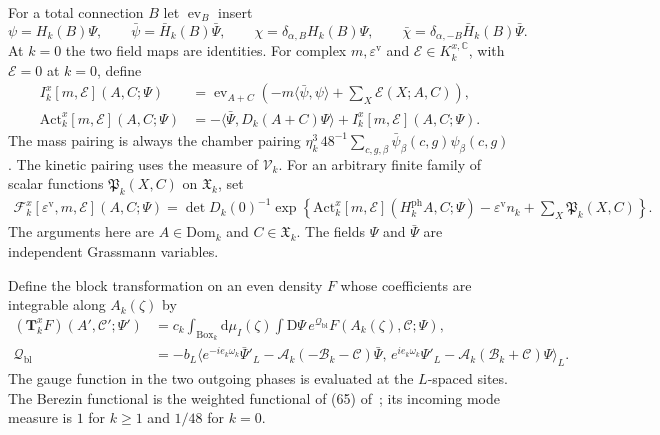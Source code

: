 \documentclass[11pt,letterpaper,reqno]{amsart}
\newcommand{\C}{\mathbb C}
\newcommand{\dd}{\mathrm d}
\newcommand{\exteq}[2]{(#1) of~\cite{#2}}
\begin{document}
For a total connection $B$ let $\operatorname{ev}_B$
insert
\[
 \psi=H_k(B)\Psi,\qquad
 \bar\psi=\bar H_k(B)\bar\Psi,\qquad
 \chi=\delta_{\alpha,B}H_k(B)\Psi,\qquad
 \bar\chi=\delta_{\alpha,-B}\bar H_k(B)\bar\Psi.
\]
At $k=0$ the two field maps are identities.
For complex $m,\varepsilon^{\mathrm v}$ and
$\mathscr E\in K_k^{x,\C}$, with $\mathscr E=0$
at $k=0$, define
\begin{equation}\label{eq:rg-step-interaction-action}
 \begin{split}
 I_k^x[m,\mathscr E](A,C;\Psi)
     &=\operatorname{ev}_{A+C}
         \left(-m\langle\bar\psi,\psi\rangle
                               +\sum_X\mathscr E(X;A,C)\right),\\
 \mathrm{Act}_k^x[m,\mathscr E](A,C;\Psi)
     &=-\langle\bar\Psi,D_k(A+C)\Psi\rangle
                                  +I_k^x[m,\mathscr E](A,C;\Psi).
 \end{split}
\end{equation}
The mass pairing is always the chamber pairing
$\eta_k^3\,48^{-1}\sum_{c,g,\beta}\bar\psi_\beta(c,g)\psi_\beta(c,g)$.
The kinetic pairing uses the measure of $\mathscr V_k$.
For an arbitrary finite family of scalar functions
$\mathfrak P_k(X,C)$ on $\mathfrak X_k$, set
\begin{equation}\label{eq:rg-step-input-density}
 \begin{split}
 \mathscr F_k^x[\varepsilon^{\mathrm v},m,\mathscr E](A,C;\Psi)
   =\det D_k(0)^{-1}\exp\left\{
         \mathrm{Act}_k^x[m,\mathscr E](H_k^{\mathrm{ph}}A,C;\Psi)
                   -\varepsilon^{\mathrm v}n_k
                              +\sum_X\mathfrak P_k(X,C)\right\}.
 \end{split}
\end{equation}
The arguments here are $A\in\mathrm{Dom}_k$ and
$C\in\mathfrak X_k$. The fields $\Psi$ and $\bar\Psi$
are independent Grassmann variables.

Define the block transformation on an even density
$F$ whose coefficients are integrable along
$A_k(\zeta)$ by
\begin{equation}\label{eq:rg-step-block-transformation}
 \begin{split}
 (\mathbf T_k^xF)(A',\mathscr C';\Psi')
  &=c_k\int_{\mathrm{Box}_k}\dd\mu_I(\zeta)
                       \int\mathrm D\Psi\,e^{\mathcal Q_{\mathrm{bl}}}
                                         F(A_k(\zeta),\mathscr C;\Psi),\\
 \mathcal Q_{\mathrm{bl}}
  &=-b_L\big\langle
       e^{-ie_k\omega_k}\bar\Psi'_L
                    -\mathcal A_k(-\mathscr B_k-\mathscr C)\bar\Psi,\,
       e^{ie_k\omega_k}\Psi'_L
                    -\mathcal A_k(\mathscr B_k+\mathscr C)\Psi
                                                \big\rangle_L.
 \end{split}
\end{equation}
The gauge function in the two outgoing phases is
evaluated at the $L$-spaced sites.
The Berezin functional is the weighted functional
of \exteq{65}{FermionBlockManuscript}; its incoming mode
measure is $1$ for $k\ge1$ and $1/48$ for $k=0$.
\end{document}

